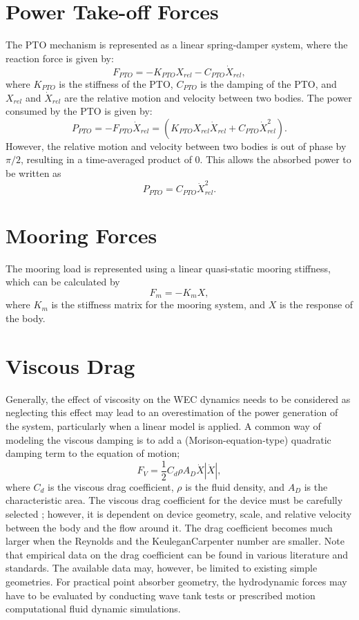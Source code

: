 \section{\noindent Power Take-off Forces}
\noindent The PTO mechanism is represented as a linear
spring-damper system, where the reaction force is given by: 
\begin{equation}
F_{PTO}=-K{}_{PTO}X_{rel}-C_{PTO}\dot{X}_{rel},
\end{equation}
where $K_{PTO}$ is the stiffness of the PTO, $C_{PTO}$ is the damping
of the PTO, and $X_{rel}$ and $\dot{X}_{rel}$ are the relative motion
and velocity between two bodies.  The power consumed by the PTO is given by:
\begin{equation}
P_{PTO} = -F_{PTO}\dot{X}_{rel}=\left(K_{PTO}X_{rel}\dot{X}_{rel}+C_{PTO}\dot{X}^{2}_{rel}\right).
\end{equation}
However, the relative motion and velocity between two bodies is out of phase by $\pi/2$, resulting in a time-averaged product of 0. This allows the absorbed power to be written as
\begin{equation}
P_{PTO} =C_{PTO}\dot{X}^{2}_{rel}.
\end{equation}

\section{\noindent Mooring Forces}
\noindent The mooring load is represented using a linear quasi-static
mooring stiffness, which can be calculated by
\begin{equation}
F_{m}=-K_{m}X,
\end{equation}
where $K_{m}$ is the stiffness matrix for the mooring system, and
$X$ is the response of the body.

\section{Viscous Drag}
\noindent Generally, the effect of viscosity on the WEC dynamics needs
to be considered as neglecting this effect may lead to an overestimation
of the power generation of the system, particularly when a linear
model is applied. A common way of modeling the viscous damping is
to add a (Morison-equation-type) quadratic damping term to the equation
of motion;
\begin{equation}
F_{V}=\frac{1}{2}C_{d}\rho A_{D}\dot{X}|\dot{X}|,
\end{equation}
where $C_{d}$ is the viscous drag coefficient, $\rho$ is the fluid density, and $A_{D}$ is the
characteristic area. The viscous drag coefficient for the device
must be carefully selected \cite{li2012synthesis,Babarit2012b}; however, it
is dependent on device geometry, scale, and relative
velocity between the body and the flow around it. The drag coefficient
becomes much larger when the Reynolds and the Keulegan\textendash Carpenter
number are smaller. Note that empirical data on the drag
coefficient can be found in various literature and standards. The available data may, 
however, be limited to existing simple geometries. For
practical point absorber geometry, the hydrodynamic forces may have
to be evaluated by conducting wave tank tests or prescribed motion
computational fluid dynamic simulations.
